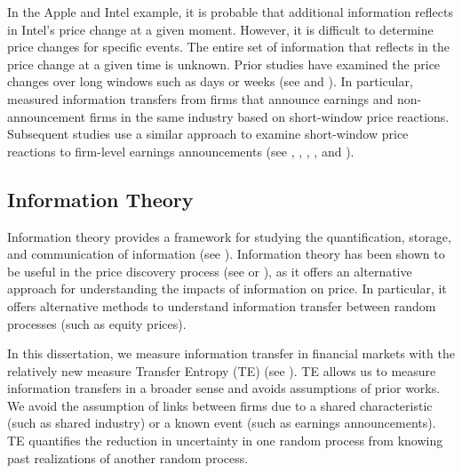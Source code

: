 In the Apple and Intel example, it is probable that additional information reflects in Intel's price change at a given moment. However, it is difficult to determine price changes for specific events. The entire set of information that reflects in the price change at a given time is unknown.  Prior studies have examined the price changes over long windows such as days or weeks (see \cite{Foster1981} and \cite{Baginiski1987}).  In particular, \cite{Foster1981} measured information transfers from firms that announce earnings and non-announcement firms in the same industry based on short-window price reactions.  Subsequent studies use a similar approach to examine short-window price reactions to firm-level earnings announcements (see \cite{ClinchSinclair1987},   \cite{PownallWaymire1989},  \cite{HanWild1990},  \cite{Wang2014},  and \cite{HannKimZheng2019}).   %

\subsection{Information Theory } \label{sec:InformationTheory}
Information theory provides a framework for studying the quantification, storage, and communication of information (see \cite{InfoTheoryApplication}).  Information theory has been  shown to be useful in the price discovery process (see \cite{Billio2012} or \cite{DieboldYilmaz2014}), as it offers an alternative approach for understanding the impacts of information on price.   In particular,  it offers alternative methods to understand information transfer between random processes (such as equity prices).  

In this dissertation,  we measure information transfer in financial markets with the relatively new measure Transfer Entropy (TE)  (see \cite{IntroToTransferEntropy}).  TE allows us to measure information transfers in a broader sense and avoids assumptions of prior works.  We avoid the assumption of links between firms due to a shared characteristic (such as shared industry) or a known event (such as earnings announcements).   TE quantifies the reduction in uncertainty in one random process from knowing past realizations of another random process.  

